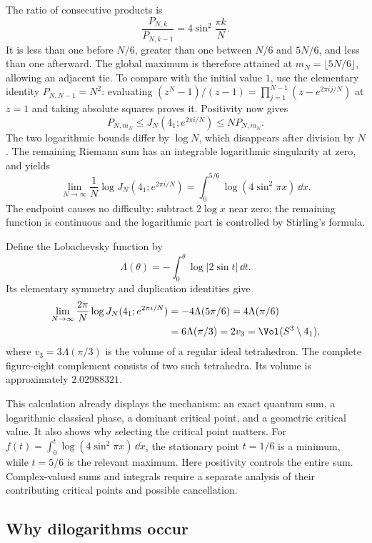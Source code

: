 The ratio of consecutive products is
\[
 \frac{P_{N,k}}{P_{N,k-1}}=4\sin^2\frac{\pi k}{N}.
\]
It is less than one before $N/6$, greater than one between $N/6$
and $5N/6$, and less than one afterward. The global maximum is
therefore attained at $m_N=\lfloor5N/6\rfloor$, allowing an adjacent
tie. To compare with the initial value $1$, use the elementary
identity $P_{N,N-1}=N^2$: evaluating
$(z^N-1)/(z-1)=\prod_{j=1}^{N-1}(z-e^{2\pi i j/N})$ at $z=1$
and taking absolute squares proves it. Positivity now gives
\[
 P_{N,m_N}\le J_N(4_1;e^{2\pi i/N})\le N P_{N,m_N}.
\]
The two logarithmic bounds differ by $\log N$, which disappears
after division by $N$. The remaining Riemann sum has an integrable
logarithmic singularity at zero, and yields
\begin{equation}
 \lim_{N\to\infty}\frac1N\log J_N(4_1;e^{2\pi i/N})
 =\int_0^{5/6}\log(4\sin^2\pi x)\,\dd x.
 \label{eq:introfigureintegral}
\end{equation}
The endpoint causes no difficulty: subtract $2\log x$ near zero;
the remaining function is continuous and the logarithmic part is
controlled by Stirling's formula.

Define the Lobachevsky function by
\[
 \Lambda(\theta)=-\int_0^\theta\log|2\sin t|\,\dd t.
\]
Its elementary symmetry and duplication identities give
\begin{align}
 \lim_{N\to\infty}\frac{2\pi}{N}
       \log J_N(4_1;e^{2\pi i/N})
 &=-4\Lambda(5\pi/6)=4\Lambda(\pi/6)\notag\\
 &=6\Lambda(\pi/3)=2v_3
  =\Vol(S^3\setminus4_1),
 \label{eq:introfigurevolume}
\end{align}
where $v_3=3\Lambda(\pi/3)$ is the volume of a regular ideal
tetrahedron. The complete figure-eight complement consists of two
such tetrahedra. Its volume is approximately $2.02988321$.

This calculation already displays the mechanism: an exact quantum
sum, a logarithmic classical phase, a dominant critical point,
and a geometric critical value. It also shows why selecting the
critical point matters. For
$f(t)=\int_0^t\log(4\sin^2\pi x)\,\dd x$, the stationary point
$t=1/6$ is a minimum, while $t=5/6$ is the relevant maximum.
Here positivity controls the entire sum. Complex-valued sums and
integrals require a separate analysis of their contributing
critical points and possible cancellation.

\subsection{Why dilogarithms occur}
\label{sec:introdilog}

